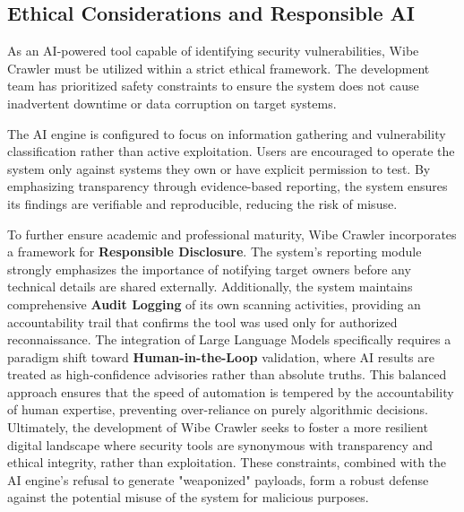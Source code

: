 \documentclass[12pt,oneside,a4paper]{book}
\begin{document}
\subsection{Ethical Considerations and Responsible AI}

As an AI-powered tool capable of identifying security vulnerabilities, Wibe Crawler must be utilized within a strict ethical framework. The development team has prioritized safety constraints to ensure the system does not cause inadvertent downtime or data corruption on target systems.

The AI engine is configured to focus on information gathering and vulnerability classification rather than active exploitation. Users are encouraged to operate the system only against systems they own or have explicit permission to test. By emphasizing transparency through evidence-based reporting, the system ensures its findings are verifiable and reproducible, reducing the risk of misuse.

To further ensure academic and professional maturity, Wibe Crawler incorporates a framework for \textbf{Responsible Disclosure}. The system's reporting module strongly emphasizes the importance of notifying target owners before any technical details are shared externally. Additionally, the system maintains comprehensive \textbf{Audit Logging} of its own scanning activities, providing an accountability trail that confirms the tool was used only for authorized reconnaissance. The integration of Large Language Models specifically requires a paradigm shift toward \textbf{Human-in-the-Loop} validation, where AI results are treated as high-confidence advisories rather than absolute truths. This balanced approach ensures that the speed of automation is tempered by the accountability of human expertise, preventing over-reliance on purely algorithmic decisions. Ultimately, the development of Wibe Crawler seeks to foster a more resilient digital landscape where security tools are synonymous with transparency and ethical integrity, rather than exploitation. These constraints, combined with the AI engine's refusal to generate "weaponized" payloads, form a robust defense against the potential misuse of the system for malicious purposes.

\nocite{*}
\renewcommand{\bibname}{References}
\cleardoublepage
{}
{}


\end{document}
